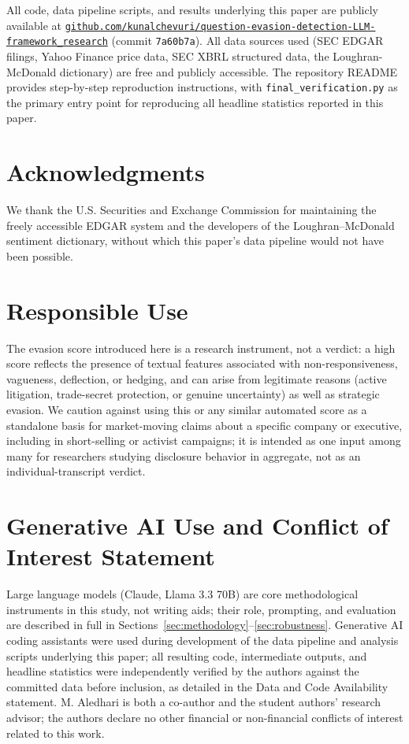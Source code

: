 \documentclass[conference]{IEEEtran}
\begin{document}
All code, data pipeline scripts, and results underlying this paper are publicly available at \href{https://github.com/kunalchevuri/question-evasion-detection-LLM-framework_research}{\footnotesize\texttt{github.com/kunalchevuri/\allowbreak question-evasion-detection-LLM-framework\_research}} (commit \texttt{7a60b7a}). All data sources used (SEC EDGAR filings, Yahoo Finance price data, SEC XBRL structured data, the Loughran-McDonald dictionary) are free and publicly accessible. The repository README provides step-by-step reproduction instructions, with \texttt{final\_verification.py} as the primary entry point for reproducing all headline statistics reported in this paper.

\section*{Acknowledgments}

We thank the U.S. Securities and Exchange Commission for maintaining the freely accessible EDGAR system and the developers of the Loughran--McDonald sentiment dictionary, without which this paper's data pipeline would not have been possible.

\section*{Responsible Use}

The evasion score introduced here is a research instrument, not a verdict: a high score reflects the presence of textual features associated with non-responsiveness, vagueness, deflection, or hedging, and can arise from legitimate reasons (active litigation, trade-secret protection, or genuine uncertainty) as well as strategic evasion. We caution against using this or any similar automated score as a standalone basis for market-moving claims about a specific company or executive, including in short-selling or activist campaigns; it is intended as one input among many for researchers studying disclosure behavior in aggregate, not as an individual-transcript verdict.

\section*{Generative AI Use and Conflict of Interest Statement}

Large language models (Claude, Llama 3.3 70B) are core methodological instruments in this study, not writing aids; their role, prompting, and evaluation are described in full in Sections~\ref{sec:methodology}--\ref{sec:robustness}. Generative AI coding assistants were used during development of the data pipeline and analysis scripts underlying this paper; all resulting code, intermediate outputs, and headline statistics were independently verified by the authors against the committed data before inclusion, as detailed in the Data and Code Availability statement. M. Aledhari is both a co-author and the student authors' research advisor; the authors declare no other financial or non-financial conflicts of interest related to this work.



\end{document}
